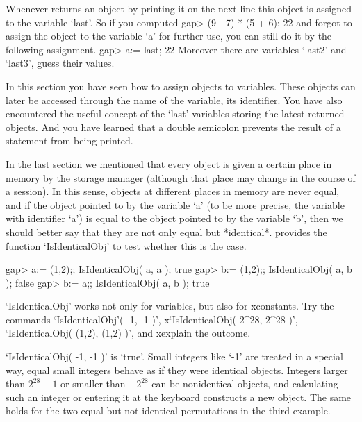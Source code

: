 Whenever {\GAP} returns an object by printing it  on  the next  line this
object is assigned to the variable `last'.  So if you computed
\beginexample
    gap> (9 - 7) * (5 + 6);
    22 
\endexample
and forgot to assign the object to the  variable `a' for further use, you
can still do it by the following assignment.
\beginexample
    gap> a:= last;
    22 
\endexample
Moreover there are variables `last2' and `last3', guess their values.

In this section you  have seen how to  assign objects to variables. These
objects  can  later be accessed  through the  name  of the  variable, its
identifier. You  have also encountered the  useful concept of  the `last'
variables storing the latest returned  objects. And you have learned that
a double semicolon prevents the result of a statement from being printed.

\null

%
In the last section  we mentioned that every object   is given a  certain
place  in memory by the  {\GAP} storage manager  (although that place may
change in the course  of  a {\GAP}  session). In  this sense, objects  at
different places in memory are never equal, and if  the object pointed to
by the  variable  `a' (to be more  precise,  the variable with identifier
`a')  is  equal to the   object pointed to by  the  variable `b', then we
should better  say that they  are not only  equal but *identical*. {\GAP}
provides the function `IsIdenticalObj' to test whether this is the case.

\beginexample
    gap> a:= (1,2);; IsIdenticalObj( a, a );
    true
    gap> b:= (1,2);; IsIdenticalObj( a, b );
    false
    gap> b:= a;; IsIdenticalObj( a, b );
    true
\endexample

%
\exercise `IsIdenticalObj' works not   only for variables, but  also  for
xconstants.   Try   the   commands      `IsIdenticalObj'(  -1,  -1    )',
x`IsIdenticalObj( 2^28, 2^28   )', `IsIdenticalObj( (1,2),  (1,2) )', and
xexplain the outcome.

\answer `IsIdenticalObj(  -1, -1 )' is  `true'.  Small integers like `-1'
are treated in a special way, equal small integers behave as if they were
identical  objects. Integers  larger    than $2^{28}-1$ or  smaller  than
$-2^{28}$ can be nonidentical objects, and calculating such an integer or
entering it at the  keyboard constructs a new object.  The same holds for
the two equal but not identical permutations in the third example.

